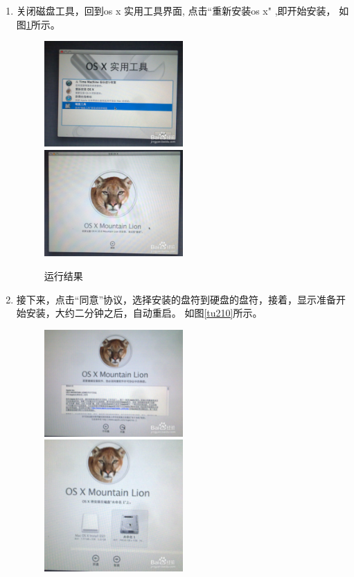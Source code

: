 \documentclass{article}
\begin{document}
\begin{enumerate}
\item 关闭磁盘工具，回到os x 实用工具界面, 点击“重新安装os x" ,即开始安装，
如图\ref{tu28}所示。
\begin{figure}[!htb] %
\centering
\includegraphics[width=0.5\textwidth]{figures/tu28.png}
\includegraphics[width=0.5\textwidth]{figures/tu29.png}
\caption{\small 运行结果}
\label{tu28}
\end{figure}
\item 接下来，点击“同意”协议，选择安装的盘符到硬盘的盘符，接着，显示准备开始安装，大约二分钟之后，自动重启。
如图\ref{tu210}所示。
\begin{figure}[!htb] %
\centering
\includegraphics[width=0.5\textwidth]{figures/tu210.png}
\includegraphics[width=0.5\textwidth]{figures/tu211.png}

\end{figure}
\end{enumerate}
\end{document}
